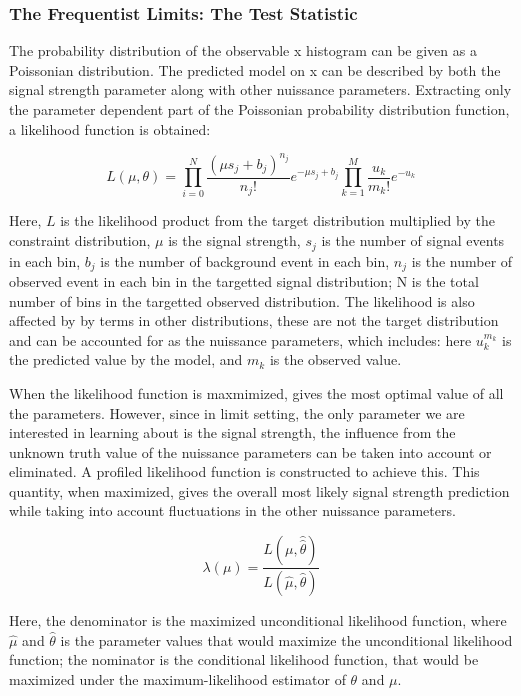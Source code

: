 \subsubsection{The Frequentist Limits: The Test Statistic}
\label{section:freqTestStats}

The probability distribution of the observable x histogram can be given as a Poissonian distribution. The predicted model on x can be described by both the signal strength parameter along with other nuissance parameters. Extracting only the parameter dependent part of the Poissonian probability distribution function, a likelihood function is obtained:

\begin{equation}
    L(\mu, \theta) =  \prod_{i=0}^{N} \frac{(\mu s_{j} + b_{j})^{n_j}}{n_{j}!}e^{-\mu s_j + b_j} \prod_{k=1}^{M}\frac{u_{k}}
{m_{k}!} e^{-u_{k}}
\label{eq:likelihood}
\end{equation}

Here, $L$ is the likelihood product from the target distribution multiplied by the constraint distribution, $\mu$ is the signal strength, $s_j$ is the number of signal events in each bin, $b_j$ is the number of background event in each bin, $n_j$ is the number of observed event in each bin in the targetted signal distribution; N is the total number of bins in the targetted observed distribution. The likelihood is also affected by by terms in other distributions, these
are not the target distribution and can be accounted for as the nuissance parameters, which
includes:
here $u_k^{m_k}$ is the predicted value by the model, and $m_{k}$ is the observed value. 

When the likelihood function is maxmimized, gives the most optimal value of all the parameters. However, since in limit setting, the only parameter we are interested in learning about is the signal strength, the influence from the unknown truth value of the nuissance parameters can be taken into account or eliminated. A profiled likelihood function is constructed to achieve this. This quantity, when maximized, gives the overall most likely signal strength prediction while taking into account fluctuations in the other nuissance parameters. 

\begin{equation}
\lambda(\mu) = \frac{L(\mu, \hat{\hat{\theta}})}{L(\hat{\mu}, \hat{\theta})}
\label{eq:profilelikelihood}
\end{equation}

Here, the denominator is the maximized unconditional likelihood function, where $\hat{\mu}$ and $\hat{\theta}$ is the parameter values that would maximize the unconditional likelihood function; the nominator is the conditional likelihood function, that would be maximized under the maximum-likelihood estimator of $\theta$ and $\mu$. 

